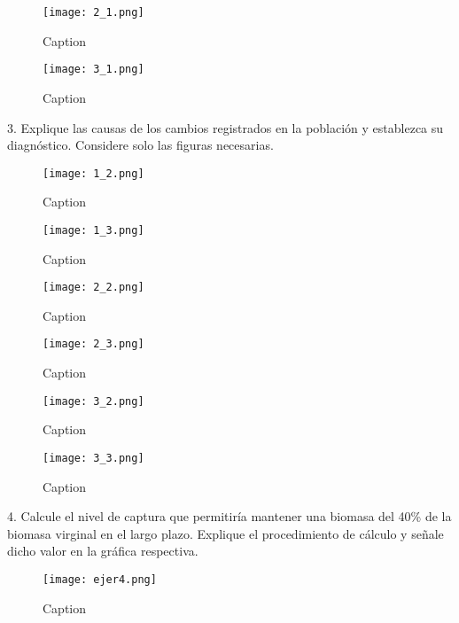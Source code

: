 \documentclass{uofa-eng-assignment}
\begin{document}
\begin{figure}[H]
    \centering
    \texttt{[image: 2\_1.png]}
    \caption{Caption}
    \label{fig:2_1}
\end{figure}

\begin{figure}[H]
    \centering
    \texttt{[image: 3\_1.png]}
    \caption{Caption}
    \label{fig:3_1}
\end{figure}

3. Explique las causas de los cambios registrados en la población y establezca su diagnóstico. Considere solo las figuras necesarias.\\

\begin{figure}[H]
    \centering
    \texttt{[image: 1\_2.png]}
    \caption{Caption}
    \label{fig:1_2}
\end{figure}

\begin{figure}[H]
    \centering
    \texttt{[image: 1\_3.png]}
    \caption{Caption}
    \label{fig:1_3}
\end{figure}

\begin{figure}[H]
    \centering
    \texttt{[image: 2\_2.png]}
    \caption{Caption}
    \label{fig:2_2}
\end{figure}

\begin{figure}[H]
    \centering
    \texttt{[image: 2\_3.png]}
    \caption{Caption}
    \label{fig:2_3}
\end{figure}

\begin{figure}[H]
    \centering
    \texttt{[image: 3\_2.png]}
    \caption{Caption}
    \label{fig:3_2}
\end{figure}

\begin{figure}[H]
    \centering
    \texttt{[image: 3\_3.png]}
    \caption{Caption}
    \label{fig:3_3}
\end{figure}

4. Calcule el nivel de captura que permitiría mantener una biomasa del 40\% de la biomasa virginal en el largo plazo. Explique el procedimiento de cálculo y señale dicho valor en la gráfica respectiva.\\

\begin{figure}[H]
    \centering
    \texttt{[image: ejer4.png]}
    \caption{Caption}
    \label{fig:ejer4}
\end{figure}
\end{document}
